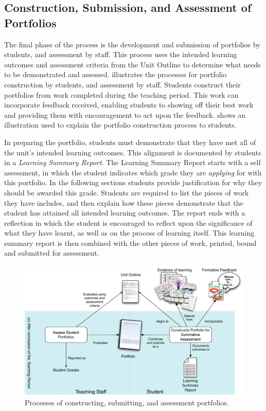 
\subsection{Construction, Submission, and Assessment of Portfolios} %
\label{ssub:construction_submission_and_assessment_of_portfolios}

The final phase of the process is the development and submission of portfolios by students, and assessment by staff. This process uses the intended learning outcomes and assessment criteria from the Unit Outline to determine what needs to be demonstrated and assessed.  illustrates the processes for portfolio construction by students, and assessment by staff. Students construct their portfolios from work completed during the teaching period. This work can incorporate feedback received, enabling students to showing off their best work and providing them with encouragement to act upon the feedback.  shows an illustration used to explain the portfolio construction process to students. 

In preparing the portfolio, students must demonstrate that they have met all of the unit's intended learning outcomes. This alignment is documented by students in a \emph{Learning Summary Report}. The Learning Summary Report starts with a self assessment, in which the student indicates which grade they are \emph{applying} for with this portfolio. In the following sections students provide justification for why they should be awarded this grade. Students are required to list the pieces of work they have includes, and then explain how these pieces demonstrate that the student has attained all intended learning outcomes. The report ends with a reflection in which the student is encouraged to reflect upon the significance of what they have learnt, as well as on the process of learning itself. This learning summary report is then combined with the other pieces of work, printed, bound and submitted for assessment.

\begin{figure}[p]
	\centering
	\includegraphics[width=\textwidth]{PortfolioConstructionAssessment}
	\caption{Processes of constructing, submitting, and assessment portfolios.}
	\label{fig:portfolio_processes}
\end{figure}

